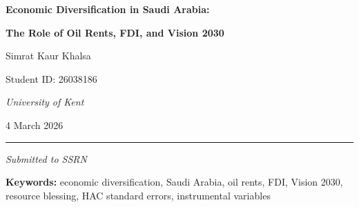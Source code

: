 \documentclass[12pt, a4paper]{article}
\begin{document}

\begin{titlepage}
    \centering
    \vspace*{3cm}
    {\LARGE\bfseries Economic Diversification in Saudi Arabia:\par}
    \vspace{0.4em}
    {\Large\bfseries The Role of Oil Rents, FDI, and Vision 2030\par}
    \vspace{2.5cm}
    {\large Simrat Kaur Khalsa\par}
    \vspace{0.4em}
    {\normalsize Student ID: 26038186\par}
    \vspace{0.4em}
    {\normalsize\itshape University of Kent\par}
    \vspace{3cm}
    {\normalsize 4 March 2026\par}
    \vfill
    \hrule
    \vspace{0.5em}
    {\small\itshape Submitted to SSRN\par}
\end{titlepage}

\newpage
\thispagestyle{plain}
\begin{abstract}
\noindent
This paper examines the impact of oil rents, Foreign Direct Investment (FDI), and the Vision 2030 reform programme on economic diversification in Saudi Arabia over the period 1990--2021. Using time-series econometric methods --- including OLS with HAC (Newey-West) standard errors, interaction analysis, and Instrumental Variable (IV) estimation via 2SLS --- the study finds that oil rents have exerted a positive and statistically significant effect on diversification, supporting the ``resource blessing'' hypothesis. Vision 2030 is associated with a significant upward level shift in the diversification index. FDI, however, remains statistically insignificant across all specifications, suggesting that foreign capital has not yet become a primary driver of structural transformation. These findings underscore the central role of coherent state-led policy in navigating the transition beyond hydrocarbon dependence.
\end{abstract}

\vspace{1em}
\noindent\textbf{Keywords:} economic diversification, Saudi Arabia, oil rents, FDI, Vision 2030, resource blessing, HAC standard errors, instrumental variables
\end{document}
